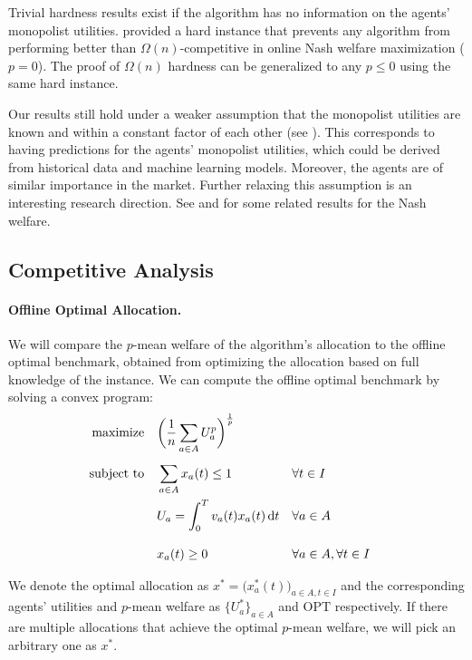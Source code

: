 \documentclass[11pt,letterpaper]{article}
\newcommand{\OPT}{\mathrm{OPT}}
\newcommand{\dif}[1]{\,\text{\rm d} #1}
\newcommand{\utility}{U}
\begin{document}
Trivial hardness results exist if the algorithm has no information on the agents' monopolist utilities.
\citet{BanerjeeGGJ:SODA:2022} provided a hard instance that prevents any algorithm from performing better than $\Omega(n)$-competitive in online Nash welfare maximization ($p = 0$). The proof of $\Omega(n)$ hardness can be generalized to any $p \leq 0$ using the same hard instance.


Our results still hold under a weaker assumption that the monopolist utilities are known and within a constant factor of each other (see ). This corresponds to having predictions for the agents' monopolist utilities, which could be derived from historical data and machine learning models. Moreover, the agents are of similar importance in the market.
Further relaxing this assumption is an interesting research direction. See \citet{BanerjeeGGJ:SODA:2022} and \citet{HuangLSW:WINE:2023} for some related results for the Nash welfare.

\subsection{Competitive Analysis}

\paragraph{Offline Optimal Allocation.}
We will compare the $p$-mean welfare of the algorithm's allocation to the offline optimal benchmark, obtained from optimizing the allocation based on full knowledge of the instance.
We can compute the offline optimal benchmark by solving a convex program:
\begin{align*}
	\text{maximize} \quad & \bigg( \frac{1}{n} \sum_{a \in A} \utility_a^p \bigg)^{\frac{1}{p}} \\[1ex]
	\text{subject to} \quad & \sum_{a \in A} x_a(t) \le 1 && \forall t \in I \\
	& \utility_a = \int_0^T v_a(t) x_a(t) \dif{t} && \forall a \in A \\[2ex]
	& x_a(t) \ge 0 && \forall a \in A, \forall t \in I	\notag
\end{align*}

We denote the optimal allocation as $x^* = \big( x_a^*(t) \big)_{a \in A, t \in I}$ and the corresponding agents' utilities and $p$-mean welfare as $\{U_a^*\}_{a\in A}$ and $\OPT$ respectively.
If there are multiple allocations that achieve the optimal $p$-mean welfare, we will pick an arbitrary one as $x^*$.
\end{document}

